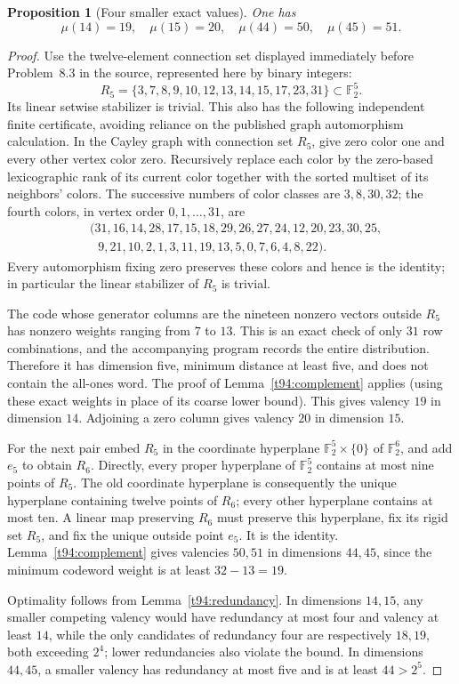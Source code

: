 \documentclass[11pt,a4paper]{article}
\newtheorem{proposition}[theorem]{Proposition}
\theoremstyle{definition}
\theoremstyle{remark}
\begin{document}
\begin{proposition}[Four smaller exact values]
\label{t94:small}
One has
\[
 \mu(14)=19,\quad\mu(15)=20,\quad
 \mu(44)=50,\quad\mu(45)=51.
\]
\end{proposition}
\begin{proof}
Use the twelve-element connection set displayed immediately before
Problem~8.3 in the source, represented here by binary integers:
\[
 R_5=\{3,7,8,9,10,12,13,14,15,17,23,31\}\subset\mathbb F_2^5.
\]
Its linear setwise stabilizer is trivial. This also has the following
independent finite certificate, avoiding reliance on the published graph
automorphism calculation. In the Cayley graph with connection set $R_5$,
give zero color one and every other vertex color zero. Recursively replace
each color by the zero-based lexicographic rank of its current color
together with the sorted multiset of its neighbors' colors. The successive
numbers of color classes are $3,8,30,32$; the fourth colors, in vertex order
$0,1,\ldots,31$, are
\[
\begin{split}
 &(31,16,14,28,17,15,18,29,26,27,24,12,20,23,30,25,\\
 &\hspace{8pt}9,21,10,2,1,3,11,19,13,5,0,7,6,4,8,22).
\end{split}
\]
Every automorphism fixing zero preserves these colors and hence is the
identity; in particular the linear stabilizer of $R_5$ is trivial.

The code whose generator columns are the nineteen nonzero vectors
outside $R_5$ has nonzero weights ranging from $7$ to $13$. This is an
exact check of only $31$ row combinations, and the accompanying program
records the entire distribution. Therefore it has dimension five,
minimum distance at least five, and does not contain the all-ones word.
The proof of Lemma~\ref{t94:complement} applies (using these exact weights
in place of its coarse lower bound). This gives valency $19$ in dimension
$14$. Adjoining a zero column gives valency $20$ in dimension $15$.

For the next pair embed $R_5$ in the coordinate hyperplane
$\mathbb F_2^5\times\{0\}$ of $\mathbb F_2^6$, and add $e_5$ to obtain
$R_6$. Directly, every proper hyperplane of $\mathbb F_2^5$ contains at
most nine points of $R_5$. The old coordinate hyperplane is consequently
the unique hyperplane containing twelve points of $R_6$; every other
hyperplane contains at most ten. A linear map preserving $R_6$ must
preserve this hyperplane, fix its rigid set $R_5$, and fix the unique
outside point $e_5$. It is the identity. Lemma~\ref{t94:complement} gives
valencies $50,51$ in dimensions $44,45$, since the minimum codeword
weight is at least $32-13=19$.

Optimality follows from Lemma~\ref{t94:redundancy}. In dimensions
$14,15$, any smaller competing valency would have redundancy at most
four and valency at least $14$, while the only candidates of redundancy
four are respectively $18,19$, both exceeding $2^4$; lower redundancies
also violate the bound. In dimensions $44,45$, a smaller valency has
redundancy at most five and is at least $44>2^5$.
\end{proof}
\end{document}
